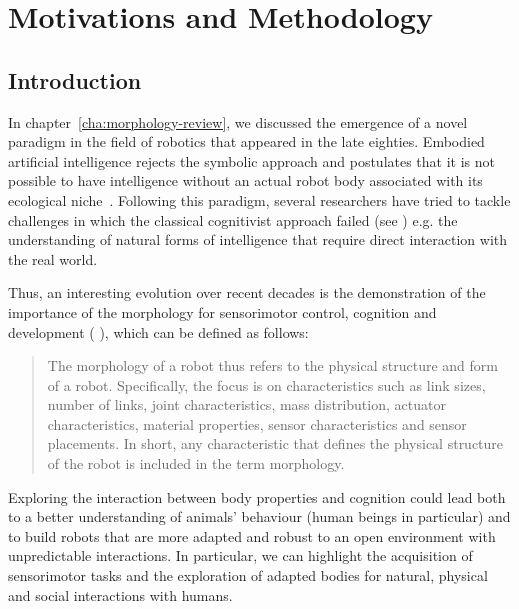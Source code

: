
\chapter{Motivations and Methodology}
\label{cha:methodology}

\section{Introduction} %

In chapter~\ref{cha:morphology-review}, we discussed the emergence of a novel paradigm in the field of robotics that appeared in the late eighties.  Embodied artificial intelligence rejects the symbolic approach and postulates that it is not possible to have intelligence without an actual robot body associated with its ecological niche~\parencite{pfeifer2001understanding}. Following this paradigm, several researchers have tried to tackle challenges in which the classical cognitivist approach failed (see \parencite{brooks1986achieving}) e.g. the understanding of natural forms of intelligence that require direct interaction with the real world.

Thus, an interesting evolution over recent decades is the demonstration of the importance of the morphology for sensorimotor control, cognition and development (\parencite{kaplan2008corps} \parencite{steels1995artificial} \parencite{Pfeifer06}), which can be defined as follows:
\begin{quotation}
    The morphology of a robot thus refers to the physical structure and form of a robot. Specifically, the focus is on characteristics such as link sizes, number of links, joint characteristics, mass distribution, actuator characteristics, material properties, sensor characteristics and sensor placements. In short, any characteristic that defines the physical structure of the robot is included in the term morphology.
\end{quotation}

Exploring the interaction between body properties and cognition could lead both to a better understanding of animals’ behaviour (human beings in particular) and to build robots that are more adapted and robust to an open environment with unpredictable interactions. In particular, we can highlight the acquisition of sensorimotor tasks and the exploration of adapted bodies for natural, physical and social interactions with humans.

